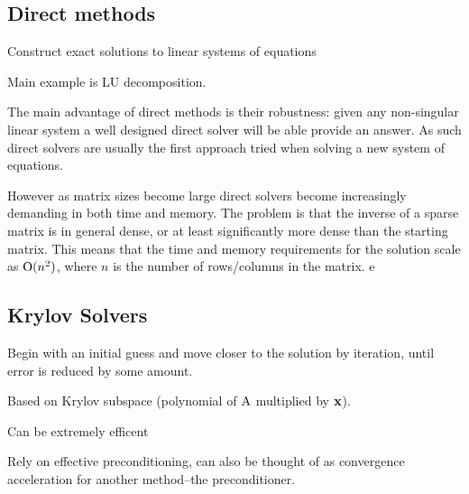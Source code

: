 \subsection{Direct methods}
\label{sec:direct-methods}

Construct exact solutions to linear systems of equations

Main example is LU decomposition.

The main advantage of direct methods is their robustness: given any non-singular linear system a well designed direct solver will be able provide an answer.
As such direct solvers are usually the first approach tried when solving a new system of equations.

However as matrix sizes become large direct solvers become increasingly demanding in both time and memory.
The problem is that the inverse of a sparse matrix is in general dense, or at least significantly more dense than the starting matrix.
This means that the time and memory requirements for the solution scale as $\text{O}(n^2)$, where $n$ is the number of rows/columns in the matrix.
e


\subsection{Krylov Solvers}
\label{sec:krylov-solvers}

Begin with an initial guess and move closer to the solution by iteration, until error is reduced by some amount.

Based on Krylov subspace (polynomial of $\mathrm{A}$ multiplied by $\mathbf{x}$).

Can be extremely efficent

Rely on effective preconditioning, can also be thought of as convergence acceleration for another method--the preconditioner.





